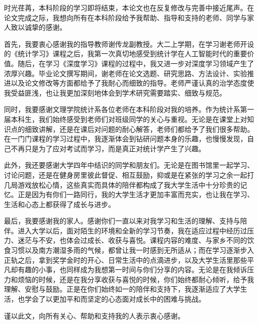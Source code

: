 
\begin{acknowledgements}
时光荏苒，本科阶段的学习即将结束，本论文也在反复修改与完善中接近尾声。在论文完成之际，我想向所有在本科阶段给予我帮助、指导和支持的老师、同学与家人致以诚挚的感谢。

首先，我要衷心感谢我的指导教师谢传龙副教授。大二上学期，在学习谢老师开设的《统计学习》课程之后，我第一次真切地感受到统计学在人工智能时代的重要价值。随后，在学习《深度学习》课程的过程中，我又进一步对深度学习领域产生了浓厚兴趣。毕业论文撰写期间，谢老师在论文选题、研究思路、方法设计、实验推进以及论文修改等方面都给予了我耐心而细致的指导。老师严谨认真的治学态度使我受益匪浅，也让我更加深刻地体会到学术研究需要踏实、细致与规范。

同时，我要感谢文理学院统计系各位老师在本科阶段对我的培养。作为统计系第一届本科生，我们始终感受到老师们对班级同学的关心与重视。无论是在课堂上对知识点的细致讲解，还是在课后对问题的耐心解答，老师们都给予了我们很多帮助。在一门门课程的学习过程中，我逐渐体会到钻研问题本身的乐趣，也慢慢发现，自己不再只是为了应对考试而学习，而是真正对统计学产生了兴趣。

此外，我还要感谢大学四年中结识的同学和朋友们。无论是在图书馆里一起学习、讨论问题，还是在健身房里彼此督促、相互鼓励，抑或是在紧张的学习之余一起打几局游戏放松心情，这些真实而具体的陪伴都构成了我大学生活中十分珍贵的记忆。正是因为有你们一路同行，我的大学生活才更加丰富而充实，也让我在学习、生活和心态上都获得了成长与进步。

最后，我要感谢我的家人。感谢你们一直以来对我学习和生活的理解、支持与陪伴。进入大学以后，面对陌生的环境和全新的学习节奏，我在适应过程中经历过压力、迷茫与不安，也体会过成长、收获与喜悦。课程内容的难度、与家乡不同的饮食习惯以及南方潮湿多雨的气候，都曾让我一时感到无所适从；而在学习逐渐步入正轨之后，拿到奖学金时的开心、日常生活中的点滴进步，以及大学生活里那些平凡却有趣的小事，也同样成为我想第一时间与你们分享的内容。无论是在我倾诉压力和烦恼的时候，还是在我分享收获与喜悦的时候，你们始终都耐心倾听，给予我理解、安慰与鼓励。正是在你们始终如一的陪伴和支持下，我逐渐适应了大学生活，也学会了以更加平和而坚定的心态面对成长中的困难与挑战。

谨以此文，向所有关心、帮助和支持我的人表示衷心感谢。
\end{acknowledgements}

